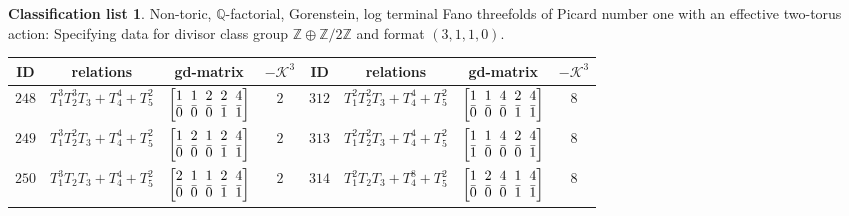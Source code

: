 \documentclass[pdftex]{sigma}%
\theoremstyle{definition}
\newtheorem{class-list}[thm]{Classification list}
\def\ZZ{{\mathbb Z}}
\def\QQ{{\mathbb Q}}
\numberwithin{equation}{section}
\begin{document}
\begin{class-list}
Non-toric, $\QQ$-factorial, Gorenstein, log terminal Fano
threefolds of Picard number one with an effective two-torus action:
Specifying data for divisor class group $\ZZ\oplus \ZZ/2\ZZ$ and
format $(3,1,1,0)$.
\begin{table}[h!]\centering\setlength{\tabcolsep}{3.5pt}
\renewcommand{\arraystretch}{1.3}\small\tabulinesep=1mm
\begin{tabu}{c|c|c|c||c|c|c|c}
\hline
ID&relations&gd-matrix&$-\mathcal{K}^3$&ID&relations&gd-matrix&$-\mathcal{K}^3$
\\
\hline
${248}$&${T_{1}^{3}T_{2}^{3}T_{3}+T_{4}^{4}+T_{5}^{2}}$
&$\arraycolsep=1mm\begin{bmatrix}{1} & {1} & {2} & {2} & {4} \\ {\bar{0}} & {\bar{0}} & {\bar{0}} & {\bar{1}} & {\bar{1}}\end{bmatrix}$&${2}$
&${312}$&${T_{1}^{2}T_{2}^{2}T_{3}+T_{4}^{4}+T_{5}^{2}}$
&$\arraycolsep=1mm\begin{bmatrix}{1} & {1} & {4} & {2} & {4} \\ {\bar{0}} & {\bar{0}} & {\bar{0}} & {\bar{1}} & {\bar{1}}\end{bmatrix}$&${8}$
\\
\hline
${249}$&${T_{1}^{3}T_{2}^{2}T_{3}+T_{4}^{4}+T_{5}^{2}}$
&$\arraycolsep=1mm\begin{bmatrix}{1} & {2} & {1} & {2} & {4} \\ {\bar{0}} & {\bar{0}} & {\bar{0}} & {\bar{1}} & {\bar{1}}\end{bmatrix}$&${2}$
&${313}$&${T_{1}^{2}T_{2}^{2}T_{3}+T_{4}^{4}+T_{5}^{2}}$
&$\arraycolsep=1mm\begin{bmatrix}{1} & {1} & {4} & {2} & {4} \\ {\bar{1}} & {\bar{0}} & {\bar{0}} & {\bar{0}} & {\bar{1}}\end{bmatrix}$&${8}$
\\
\hline
${250}$&${T_{1}^{3}T_{2}T_{3}+T_{4}^{4}+T_{5}^{2}}$
&$\arraycolsep=1mm\begin{bmatrix}{2} & {1} & {1} & {2} & {4} \\ {\bar{0}} & {\bar{0}} & {\bar{0}} & {\bar{1}} & {\bar{1}}\end{bmatrix}$&${2}$
&${314}$&${T_{1}^{2}T_{2}T_{3}+T_{4}^{8}+T_{5}^{2}}$
&$\arraycolsep=1mm\begin{bmatrix}{1} & {2} & {4} & {1} & {4} \\ {\bar{0}} & {\bar{0}} & {\bar{0}} & {\bar{1}} & {\bar{1}}\end{bmatrix}$&${8}$

\end{tabu}
\end{table}
\end{class-list}
\end{document}
